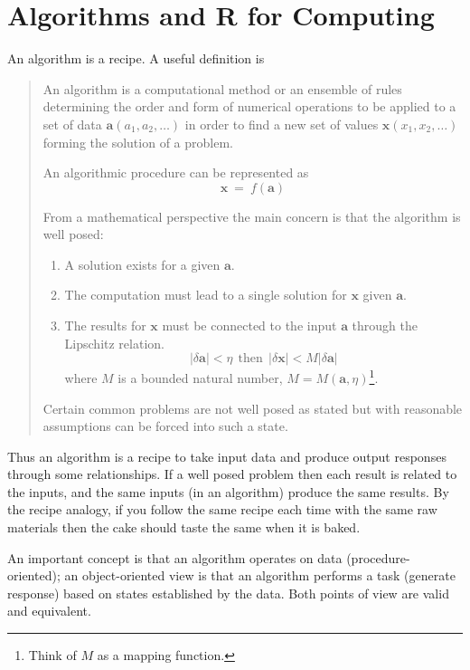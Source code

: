 \section{Algorithms and \textbf{R} for Computing}
An algorithm is a recipe.  A useful definition is 
\begin{quote}
An algorithm is a computational method or an ensemble of rules determining the order and form of numerical operations to be applied to a set of data $\textbf{a}(a_1,a_2,\dots)$ in order to find a new set of values $\textbf{x}(x_1,x_2,\dots)$ forming the solution of a problem.

An algorithmic procedure can be represented as 
\begin{equation}
\textbf{x}~=~f(\textbf{a})
\end{equation}

From a mathematical perspective the main concern is that the algorithm is well posed:
\begin{enumerate}
\item A solution exists for a given $\textbf{a}$.
\item The computation must lead to a single solution for $\textbf{x}$ given $\textbf{a}$.
\item The results for $\textbf{x}$ must be connected to the input $\textbf{a}$ through the Lipschitz relation.
\begin{equation}
|\delta \textbf{a}| < \eta~~\text{then}~~ |\delta \textbf{x}| < M|\delta \textbf{a}|
\end{equation}
where $M$ is a bounded natural number, $M = M(\textbf{a},\eta)$\footnote{Think of $M$ as a mapping function.}.
\end{enumerate}

Certain common problems are not well posed as stated but with reasonable assumptions can be forced into such a state.
\end{quote}

Thus an algorithm is a recipe to take input data and produce output responses through some relationships.  If a well posed problem then each result is related to the inputs, and the same inputs (in an algorithm) produce the same results.  By the recipe analogy, if you follow the same recipe each time with the same raw materials then the cake should taste the same when it is baked.

An important concept is that an algorithm operates on data (procedure-oriented); an object-oriented view is that an algorithm performs a task (generate response) based on states established by the data.  Both points of view are valid and equivalent.

